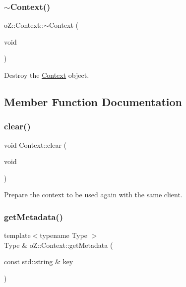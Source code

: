 \subsubsection{\texorpdfstring{$\sim$Context()}{~Context()}}
{\footnotesize\ttfamily o\+Z\+::\+Context\+::$\sim$\+Context (\begin{DoxyParamCaption}\item[{void}]{ }\end{DoxyParamCaption})\hspace{0.3cm}{\ttfamily [default]}}



Destroy the \mbox{\hyperlink{classo_z_1_1_context}{Context}} object. 



\subsection{Member Function Documentation}
\mbox{\label{classo_z_1_1_context_ade0f49a6468ea81eec1e97ace81b926e}} 
\subsubsection{\texorpdfstring{clear()}{clear()}}
{\footnotesize\ttfamily void Context\+::clear (\begin{DoxyParamCaption}\item[{void}]{ }\end{DoxyParamCaption})}



Prepare the context to be used again with the same client. 

\mbox{\label{classo_z_1_1_context_aea81da5e7f1b69e87f16d660554a1e9c}} 
\subsubsection{\texorpdfstring{getMetadata()}{getMetadata()}\hspace{0.1cm}{\footnotesize\ttfamily [1/2]}}
{\footnotesize\ttfamily template$<$typename Type $>$ \\
Type \& o\+Z\+::\+Context\+::get\+Metadata (\begin{DoxyParamCaption}\item[{const std\+::string \&}]{key }\end{DoxyParamCaption})}



